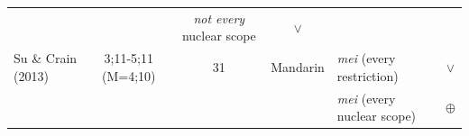 \documentclass[oneside]{report}
\theoremstyle{definition}
\theoremstyle{definition}
\theoremstyle{definition}
\theoremstyle{remark}
\begin{document}
\begin{longtable}[]{@{}lccclc@{}}
\begin{minipage}[t]{0.05\columnwidth}
\strut
\end{minipage} & \begin{minipage}[t]{0.10\columnwidth}\centering\strut
\strut
\end{minipage} & \begin{minipage}[t]{0.25\columnwidth}\raggedright\strut
\emph{not every} nuclear scope\strut
\end{minipage} & \begin{minipage}[t]{0.13\columnwidth}\centering\strut
\(\lor\)\strut
\end{minipage}\tabularnewline
\begin{minipage}[t]{0.23\columnwidth}\raggedright\strut
Su \& Crain (2013)\strut
\end{minipage} & \begin{minipage}[t]{0.07\columnwidth}\centering\strut
3;11-5;11 (M=4;10)\strut
\end{minipage} & \begin{minipage}[t]{0.05\columnwidth}\centering\strut
31\strut
\end{minipage} & \begin{minipage}[t]{0.10\columnwidth}\centering\strut
Mandarin\strut
\end{minipage} & \begin{minipage}[t]{0.25\columnwidth}\raggedright\strut
\emph{mei} (every restriction)\strut
\end{minipage} & \begin{minipage}[t]{0.13\columnwidth}\centering\strut
\(\lor\)\strut
\end{minipage}\tabularnewline
\begin{minipage}[t]{0.23\columnwidth}\raggedright\strut
\strut
\end{minipage} & \begin{minipage}[t]{0.07\columnwidth}\centering\strut
\strut
\end{minipage} & \begin{minipage}[t]{0.05\columnwidth}\centering\strut
\strut
\end{minipage} & \begin{minipage}[t]{0.10\columnwidth}\centering\strut
\strut
\end{minipage} & \begin{minipage}[t]{0.25\columnwidth}\raggedright\strut
\emph{mei} (every nuclear scope)\strut
\end{minipage} & \begin{minipage}[t]{0.13\columnwidth}\centering\strut
\(\oplus\)\strut
\end{minipage}\tabularnewline

\end{longtable}
\end{document}

